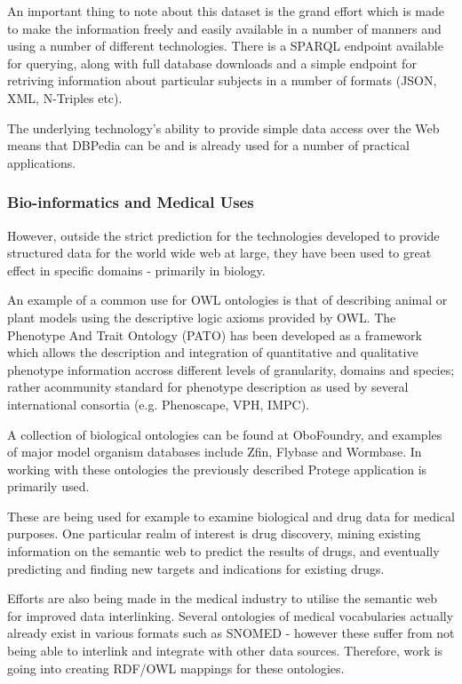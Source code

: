 \documentclass{article}
\begin{document}
An important thing to note about this dataset is the grand effort which is made
to make the information freely and easily available in a number of manners and
using a number of different technologies. There is a SPARQL endpoint available
for querying, along with full database downloads and a simple endpoint for
retriving information about particular subjects in a number of formats (JSON,
XML, N-Triples etc).

The underlying technology's ability to provide simple data access over the Web
means that DBPedia can be and is already used for a number of practical
applications.\cite{dbpedia-uses}

\subsubsection{Bio-informatics and Medical Uses}

However, outside the strict prediction for the technologies developed to provide
structured data for the world wide web at large, they have been used to great
effect in specific domains - primarily in biology.

An example of a common use for OWL ontologies is that of describing animal or
plant models using the descriptive logic axioms provided by OWL. The Phenotype
And Trait Ontology (PATO) has been developed as a framework which allows the
description and integration of quantitative and qualitative phenotype
information accross different levels of granularity, domains and
species\cite{pato}; rather acommunity standard for phenotype description as
used by several international consortia (e.g. Phenoscape\cite{phenoscape},
VPH\cite{vph}, IMPC\cite{impc}).

A collection of biological ontologies can be found at
OboFoundry\cite{obofoundry}, and examples of major model organism databases
include Zfin\cite{zfin}, Flybase\cite{flybase} and Wormbase\cite{wormbase}. In working with
these ontologies the previously described Protege application is primarily used. 

These are being used for example to examine biological and drug data for medical
purposes\cite{humontology}. One particular realm of interest is drug discovery,
mining existing information on the semantic web to predict the results of drugs,
and eventually predicting and finding new targets and indications for existing
drugs\cite{semwebdiscovery}.

Efforts are also being made in the medical industry to utilise the semantic web
for improved data interlinking. Several ontologies of medical vocabularies actually
already exist in various formats such as SNOMED - however these suffer from not
being able to interlink and integrate with other data sources. Therefore, work
is going into creating RDF/OWL mappings for these ontologies. 
\end{document}
